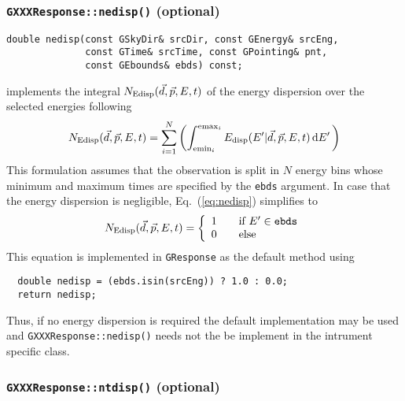 \documentclass{article}[12pt,a4]
\begin{document}
\subsubsection{{\tt GXXXResponse::nedisp()} (optional)}
\label{sec:GXXXResponse:: nedisp}

\begin{verbatim}
double nedisp(const GSkyDir& srcDir, const GEnergy& srcEng,
              const GTime& srcTime, const GPointing& pnt,
              const GEbounds& ebds) const;
\end{verbatim}
implements the integral $N_{\rm Edisp}(\vec{d}, \vec{p}, E, t)$ of the energy dispersion
over the selected energies following
\begin{equation}
N_{\rm Edisp}(\vec{d}, \vec{p}, E, t) = 
\sum_{i=1}^N \left(
\int_{{\rm emin}_i}^{{\rm emax}_i}
E_{\rm disp}(E' | \vec{d}, \vec{p}, E, t) \, {\rm d}E' \,
\right)
\label{eq:nedisp}
\end{equation}
This formulation assumes that the observation is split in $N$ energy bins
whose minimum and maximum times are specified by the {\tt ebds} argument.
In case that the energy dispersion is negligible, Eq.~(\ref{eq:nedisp}) simplifies to
\begin{equation}
N_{\rm Edisp}(\vec{d}, \vec{p}, E, t) = \left\{ 
\begin{array}{l l}
  1 & \quad \mbox{if $E' \in {\tt ebds}$}\\
  0 & \quad \mbox{else}\\ \end{array} \right.
\end{equation}
This equation is implemented in {\tt GResponse} as the default method using
\begin{verbatim}
  double nedisp = (ebds.isin(srcEng)) ? 1.0 : 0.0;
  return nedisp;
\end{verbatim}
Thus, if no energy dispersion is required the default implementation may be used
and {\tt GXXXResponse::nedisp()} needs not the be implement in the
intrument specific class.


\subsubsection{{\tt GXXXResponse::ntdisp()} (optional)}
\label{sec:GXXXResponse:: ntdisp}
\end{document}

